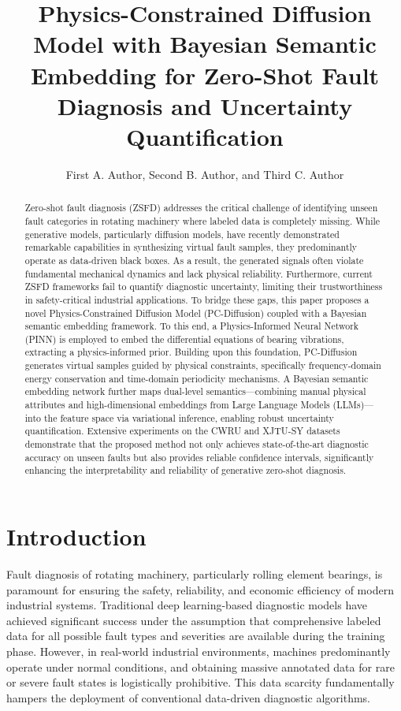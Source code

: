 \documentclass[journal]{IEEEtran}
\begin{document}
\title{Physics-Constrained Diffusion Model with Bayesian Semantic Embedding for Zero-Shot Fault Diagnosis and Uncertainty Quantification}

\author{First A. Author, Second B. Author, and Third C. Author}

\maketitle

\begin{abstract}
Zero-shot fault diagnosis (ZSFD) addresses the critical challenge of identifying unseen fault categories in rotating machinery where labeled data is completely missing. While generative models, particularly diffusion models, have recently demonstrated remarkable capabilities in synthesizing virtual fault samples, they predominantly operate as data-driven black boxes. As a result, the generated signals often violate fundamental mechanical dynamics and lack physical reliability. Furthermore, current ZSFD frameworks fail to quantify diagnostic uncertainty, limiting their trustworthiness in safety-critical industrial applications. To bridge these gaps, this paper proposes a novel Physics-Constrained Diffusion Model (PC-Diffusion) coupled with a Bayesian semantic embedding framework. To this end, a Physics-Informed Neural Network (PINN) is employed to embed the differential equations of bearing vibrations, extracting a physics-informed prior. Building upon this foundation, PC-Diffusion generates virtual samples guided by physical constraints, specifically frequency-domain energy conservation and time-domain periodicity mechanisms. A Bayesian semantic embedding network further maps dual-level semantics—combining manual physical attributes and high-dimensional embeddings from Large Language Models (LLMs)—into the feature space via variational inference, enabling robust uncertainty quantification. Extensive experiments on the CWRU and XJTU-SY datasets demonstrate that the proposed method not only achieves state-of-the-art diagnostic accuracy on unseen faults but also provides reliable confidence intervals, significantly enhancing the interpretability and reliability of generative zero-shot diagnosis.
\end{abstract}\section{Introduction}
\label{sec:intro}

Fault diagnosis of rotating machinery, particularly rolling element bearings, is paramount for ensuring the safety, reliability, and economic efficiency of modern industrial systems. Traditional deep learning-based diagnostic models \cite{zhao2019deep,lei2020applications} have achieved significant success under the assumption that comprehensive labeled data for all possible fault types and severities are available during the training phase. However, in real-world industrial environments, machines predominantly operate under normal conditions, and obtaining massive annotated data for rare or severe fault states is logistically prohibitive. This data scarcity fundamentally hampers the deployment of conventional data-driven diagnostic algorithms. 
\end{document}

